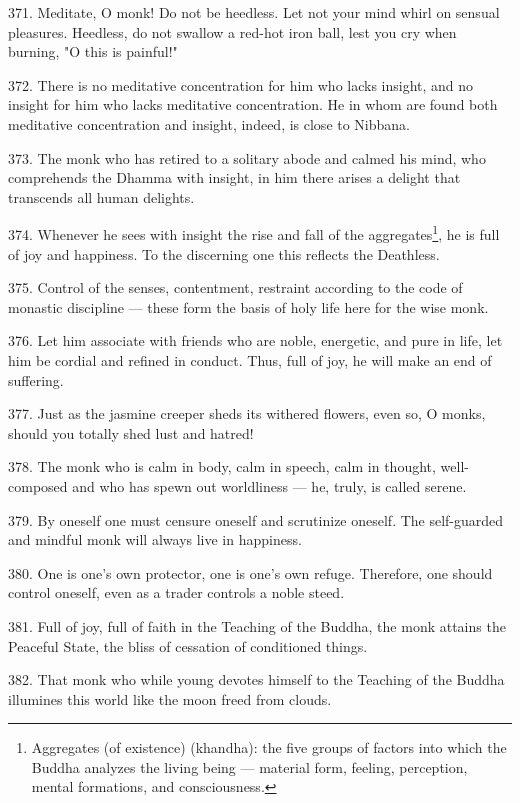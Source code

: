 371. Meditate, O monk! Do not be heedless. Let not your mind whirl on sensual pleasures. Heedless, do not swallow a red-hot iron ball, lest you cry when burning, "O this is painful!"

372. There is no meditative concentration for him who lacks insight, and no insight for him who lacks meditative concentration. He in whom are found both meditative concentration and insight, indeed, is close to Nibbana.

373. The monk who has retired to a solitary abode and calmed his mind, who comprehends the Dhamma with insight, in him there arises a delight that transcends all human delights.

374. Whenever he sees with insight the rise and fall of the aggregates\footnote{Aggregates (of existence) (khandha): the five groups of factors into which the Buddha analyzes the living being — material form, feeling, perception, mental formations, and consciousness.}, he is full of joy and happiness. To the discerning one this reflects the Deathless.

375. Control of the senses, contentment, restraint according to the code of monastic discipline — these form the basis of holy life here for the wise monk.

376. Let him associate with friends who are noble, energetic, and pure in life, let him be cordial and refined in conduct. Thus, full of joy, he will make an end of suffering.

377. Just as the jasmine creeper sheds its withered flowers, even so, O monks, should you totally shed lust and hatred!

378. The monk who is calm in body, calm in speech, calm in thought, well-composed and who has spewn out worldliness — he, truly, is called serene.

379. By oneself one must censure oneself and scrutinize oneself. The self-guarded and mindful monk will always live in happiness.

380. One is one's own protector, one is one's own refuge. Therefore, one should control oneself, even as a trader controls a noble steed.

381. Full of joy, full of faith in the Teaching of the Buddha, the monk attains the Peaceful State, the bliss of cessation of conditioned things.

382. That monk who while young devotes himself to the Teaching of the Buddha illumines this world like the moon freed from clouds.
